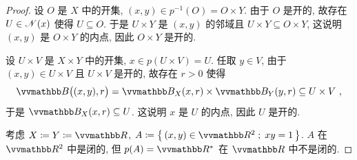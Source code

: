 \begin{proof}
    设 \(O\) 是 \(X\) 中的开集, \((x, y) \in p^{- 1}(O) = O \times Y\). 由于 \(O\) 是开的, 故存在 \(U \in \mathscr N(x)\) 使得 \(U \subseteq O\). 于是 \(U \times Y\) 是 \((x, y)\) 的邻域且 \(U \times Y \subseteq O \times Y\), 这说明 \((x, y)\) 是 \(O \times Y\) 的内点, 因此 \(O \times Y\) 是开的.

    设 \(U \times V\) 是 \(X \times Y\) 中的开集, \(x \in p(U \times V) = U\). 任取 \(y \in V\), 由于 \((x, y) \in U \times V\) 且 \(U \times V\) 是开的, 故存在 \(r > 0\) 使得
    \[
        \B\bigl((x, y), r\bigr) = \B_X(x, r) \times \B_Y(y, r) \subseteq U \times V\ ,
    \]
    于是 \(\B_X(x, r) \subseteq U\). 这说明 \(x\) 是 \(U\) 的内点, 因此 \(U\) 是开的.

    考虑 \(X \coloneqq Y \coloneqq \R\), \(A \coloneqq \bigl\{\, (x, y) \in \R^2 \;;\; x y = 1 \,\bigr\}\). \(A\) 在 \(\R^2\) 中是闭的, 但 \(p(A) = \R^\ast\) 在 \(\R\) 中不是闭的.
\end{proof}
